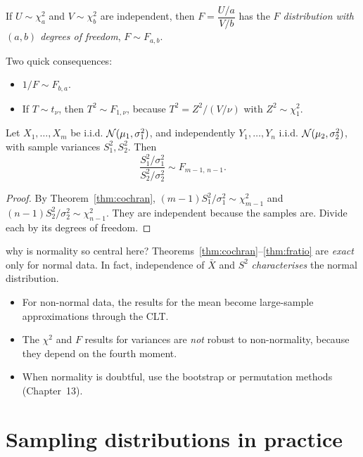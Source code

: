 \begin{definition}[$F$ distribution]
If $U\sim\chi^2_{a}$ and $V\sim\chi^2_{b}$ are independent, then $F=\dfrac{U/a}{V/b}$ has the \emph{$F$ distribution with $(a,b)$ degrees of freedom}, $F\sim F_{a,b}$.
\end{definition}

Two quick consequences:
\begin{itemize}
  \item $1/F\sim F_{b,a}$.
  \item If $T\sim t_\nu$, then $T^2\sim F_{1,\nu}$, because $T^2=Z^2/(V/\nu)$ with $Z^2\sim\chi^2_1$.
\end{itemize}

\begin{theorem}\label{thm:fratio}
Let $X_1,\dots,X_m$ be i.i.d. $\mathcal{N}(\mu_1,\sigma_1^2)$, and independently $Y_1,\dots,Y_n$ i.i.d. $\mathcal{N}(\mu_2,\sigma_2^2)$, with sample variances $S_1^2,S_2^2$. Then
\[ \frac{S_1^2/\sigma_1^2}{S_2^2/\sigma_2^2}\sim F_{m-1,\,n-1}. \]
\end{theorem}

\begin{proof}
By Theorem~\ref{thm:cochran}, $(m-1)S_1^2/\sigma_1^2\sim\chi^2_{m-1}$ and $(n-1)S_2^2/\sigma_2^2\sim\chi^2_{n-1}$. They are independent because the samples are. Divide each by its degrees of freedom.
\end{proof}

\begin{interview}{why is normality so central here?}
Theorems~\ref{thm:cochran}--\ref{thm:fratio} are \emph{exact} only for normal data. In fact, independence of $\bar{X}$ and $S^2$ \emph{characterises} the normal distribution.
\begin{itemize}
  \item For non-normal data, the results for the mean become large-sample approximations through the CLT.
  \item The $\chi^2$ and $F$ results for variances are \emph{not} robust to non-normality, because they depend on the fourth moment.
  \item When normality is doubtful, use the bootstrap or permutation methods (Chapter~13).
\end{itemize}
\end{interview}

\section{Sampling distributions in practice}

